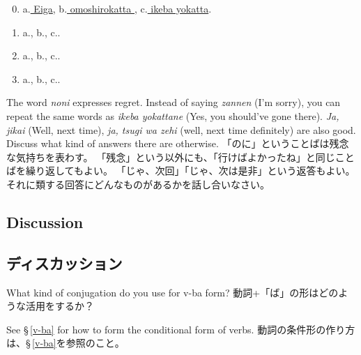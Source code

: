 \documentclass[uplatex,dvipdfmx,b5paper,english,10pt]{jsbook}
\begin{document}
\begin{enumerate}
 \setcounter{enumi}{-1}
 \item a.\underline{ Eiga\hspace{8.6zw}}, b.\underline{ omoshirokatta \hspace{3.4zw}}, c.\underline{ ikeba yokatta\hspace{3.4zw}}.
 \item a.\underline{\hspace{11zw}}, b.\underline{\hspace{11zw}}, c.\underline{\hspace{10zw}}.
 \item a.\underline{\hspace{11zw}}, b.\underline{\hspace{11zw}}, c.\underline{\hspace{10zw}}.
 \item a.\underline{\hspace{11zw}}, b.\underline{\hspace{11zw}}, c.\underline{\hspace{10zw}}.
\end{enumerate}

\begin{toianswer}
\ifEnglish
The word {\it noni\/} expresses regret.
Instead of saying {\it zannen\/} (I'm sorry), you can repeat the same words as {\it ikeba yokattane\/} (Yes, you should've gone there).
{\it Ja, jikai\/} (Well, next time), {\it ja, tsugi wa zehi\/} (well, next time definitely) are also good.
Discuss what kind of answers there are otherwise.
\else
「のに」ということばは残念な気持ちを表わす。
「残念」という以外にも、「行けばよかったね」と同じことばを繰り返してもよい。
「じゃ、次回」「じゃ、次は是非」という返答もよい。
それに類する回答にどんなものがあるかを話し合いなさい。
\fi
\end{toianswer}

\ifEnglish
\subsection{Discussion}
\else
\subsection{ディスカッション}
\fi

\begin{toiquestion}
\ifEnglish
What kind of conjugation do you use for v-ba form?
\else
動詞+「ば」の形はどのような活用をするか？
\fi
\end{toiquestion}
\begin{toianswer}
\ifEnglish
See \S\,\ref{v-ba} for how to form the conditional form of verbs.
\else
動詞の条件形の作り方は、\S\,\ref{v-ba}を参照のこと。
\fi
\end{toianswer}
\end{document}
